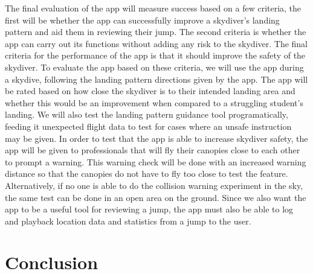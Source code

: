 \documentclass[11pt, a4paper, twocolumn]{article}
\begin{document}
The final evaluation of the app will measure success based on a few criteria, the first will be whether the app can successfully improve a skydiver's landing pattern and aid them in reviewing their jump. The second criteria is whether the app can carry out its functions without adding any risk to the skydiver. The final criteria for the performance of the app is that it should improve the safety of the skydiver. To evaluate the app based on these criteria, we will use the app during a skydive, following the landing pattern directions given by the app. The app will be rated based on how close the skydiver is to their intended landing area and whether this would be an improvement when compared to a struggling student's landing. We will also test the landing pattern guidance tool programatically, feeding it unexpected flight data to test for cases where an unsafe instruction may be given. In order to test that the app is able to increase skydiver safety, the app will be given to professionals that will fly their canopies close to each other to prompt a warning. This warning check will be done with an increased warning distance so that the canopies do not have to fly too close to test the feature. Alternatively, if no one is able to do the collision warning experiment in the sky, the same test can be done in an open area on the ground. Since we also want the app to be a useful tool for reviewing a jump, the app must also be able to log and playback location data and statistics from a jump to the user.

\section{Conclusion} %




\printbibliography{}
\end{document}
